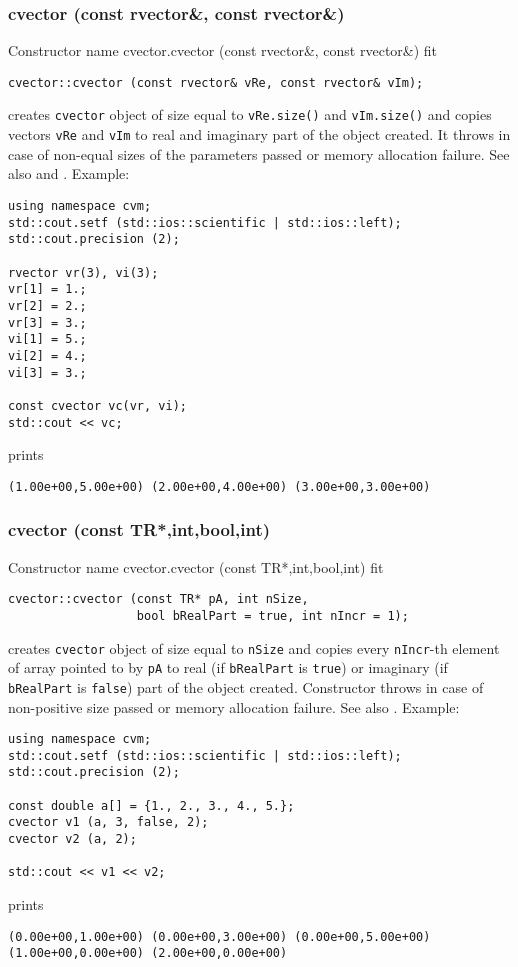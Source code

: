 \subsubsection{cvector (const rvector\&, const rvector\&)}
Constructor%
\pdfdest name {cvector.cvector (const rvector&, const rvector&)} fit
\begin{verbatim}
cvector::cvector (const rvector& vRe, const rvector& vIm);
\end{verbatim}
creates  \verb"cvector" object
of size equal to \verb"vRe.size()" and \verb"vIm.size()"
and copies vectors \verb"vRe" and \verb"vIm"
to  real and imaginary part of the object created.
It throws  
in case of non-equal sizes of the parameters passed
or memory allocation failure.
See also  and .
Example:
\begin{Verbatim}
using namespace cvm;
std::cout.setf (std::ios::scientific | std::ios::left);
std::cout.precision (2);

rvector vr(3), vi(3);
vr[1] = 1.;
vr[2] = 2.;
vr[3] = 3.;
vi[1] = 5.;
vi[2] = 4.;
vi[3] = 3.;

const cvector vc(vr, vi);
std::cout << vc;
\end{Verbatim}
prints
\begin{Verbatim}
(1.00e+00,5.00e+00) (2.00e+00,4.00e+00) (3.00e+00,3.00e+00)
\end{Verbatim}
\newpage



\subsubsection{cvector (const TR*,int,bool,int)}
Constructor%
\pdfdest name {cvector.cvector (const TR*,int,bool,int)} fit
\begin{verbatim}
cvector::cvector (const TR* pA, int nSize,
                  bool bRealPart = true, int nIncr = 1);
\end{verbatim}
creates  \verb"cvector" object
of size equal to \verb"nSize" and copies every
\verb"nIncr"-th element of array pointed to by \verb"pA"
to  real (if \verb"bRealPart" is \verb"true")
or imaginary (if \verb"bRealPart" is \verb"false")
part of the object created.
Constructor throws  
in case of non-positive size passed or memory allocation failure.
See also .
Example:
\begin{Verbatim}
using namespace cvm;
std::cout.setf (std::ios::scientific | std::ios::left);
std::cout.precision (2);

const double a[] = {1., 2., 3., 4., 5.};
cvector v1 (a, 3, false, 2);
cvector v2 (a, 2);

std::cout << v1 << v2;
\end{Verbatim}
prints
\begin{Verbatim}
(0.00e+00,1.00e+00) (0.00e+00,3.00e+00) (0.00e+00,5.00e+00)
(1.00e+00,0.00e+00) (2.00e+00,0.00e+00)
\end{Verbatim}
\newpage



